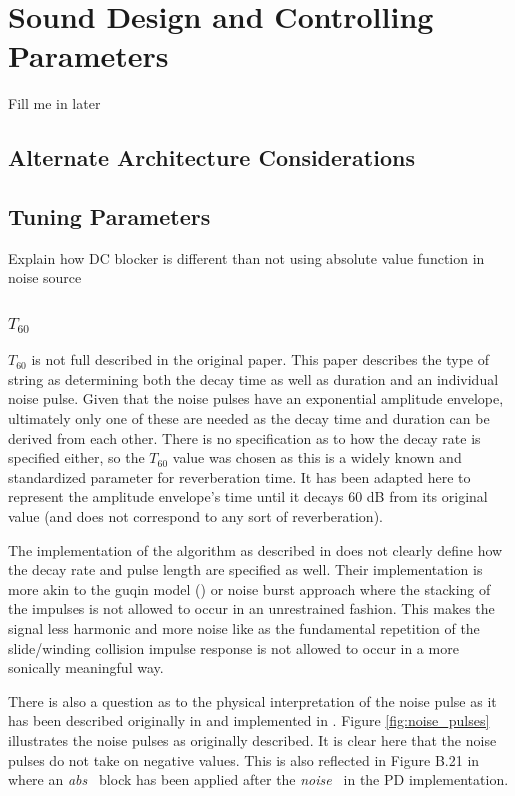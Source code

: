 \documentclass[../main.tex]{subfiles}
\begin{document}
\chapter{Sound Design and Controlling Parameters}
Fill me in later

\section{Alternate Architecture Considerations}
\section{Tuning Parameters}
Explain how DC blocker is different than not using absolute value function in noise source
\subsection{$T_{60}$}
$T_{60}$ is not full described in the original  paper. This paper describes the type of string as determining both the decay time as well as duration and an individual noise pulse. Given that the noise pulses have an exponential amplitude envelope, ultimately only one of these are needed as the decay time and duration can be derived from each other. There is no specification as to how the decay rate is specified either, so the $T_{60}$ value was chosen as this is a widely known and standardized parameter for reverberation time. It has been adapted here to represent the amplitude envelope's time until it decays 60 dB from its original value (and does not correspond to any sort of reverberation).

The implementation of the algorithm as described in  does not clearly define how the decay rate and pulse length are specified as well. Their implementation is more akin to the guqin model () or noise burst approach where the stacking of the impulses is not allowed to occur in an unrestrained fashion. This makes the signal less harmonic and more noise like as the fundamental repetition of the slide/winding collision impulse response is not allowed to occur in a more sonically meaningful way.

There is also a question as to the physical interpretation of the noise pulse as it has been described originally in  and implemented in . Figure \ref{fig:noise_pulses} illustrates the noise pulses as originally described. It is clear here that the noise pulses do not take on negative values. This is also reflected in Figure B.21 in  where an \emph{abs~} block has been applied after the \emph{noise~} in the PD implementation.
\end{document}
